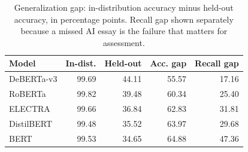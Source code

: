 \begin{table}[t]
\centering\small
\caption{Generalization gap: in-distribution accuracy minus held-out
accuracy, in percentage points. Recall gap shown separately because a
missed AI essay is the failure that matters for assessment.}
\label{tab:gap}
\begin{tabular}{@{}lrrrr@{}}
\toprule
\textbf{Model} & \textbf{In-dist.} & \textbf{Held-out} & \textbf{Acc. gap} & \textbf{Recall gap} \\
\midrule
DeBERTa-v3 & 99.69 & 44.11 & 55.57 & 17.16 \\
RoBERTa & 99.82 & 39.48 & 60.34 & 25.40 \\
ELECTRA & 99.66 & 36.84 & 62.83 & 31.81 \\
DistilBERT & 99.48 & 35.52 & 63.97 & 29.68 \\
BERT & 99.53 & 34.65 & 64.88 & 47.36 \\
\bottomrule
\end{tabular}
\end{table}